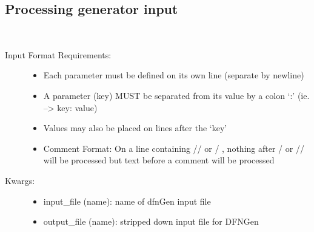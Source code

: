 \documentclass[letterpaper,10pt,english]{sphinxmanual}
\begin{document}
\subsection{Processing generator input}
\label{\detokenize{pydfnworks:processing-generator-input}}\label{\detokenize{pydfnworks:module-pydfnworks.gen_input}}

\begin{fulllineitems}
\label{\detokenize{pydfnworks:pydfnworks.gen_input.check_input}}~\begin{description}
\item[{Input Format Requirements:  }] \leavevmode\begin{itemize}
\item {} 
Each parameter must be defined on its own line (separate by newline)

\item {} 
A parameter (key) MUST be separated from its value by a colon `:' (ie. --\textgreater{} key: value)

\item {} 
Values may also be placed on lines after the `key'

\item {} 
Comment Format:  On a line containing  // or / \sphinxcode{*}, nothing after \sphinxcode{*} / or // will be processed  but text before a comment will be processed

\end{itemize}

\item[{Kwargs:}] \leavevmode\begin{itemize}
\item {} 
input\_file (name): name of dfnGen input file

\item {} 
output\_file (name): stripped down input file for DFNGen

\end{itemize}

\end{description}

\end{fulllineitems}

\label{\detokenize{pydfnworks:module-pydfnworks.distributions}}
\end{document}
